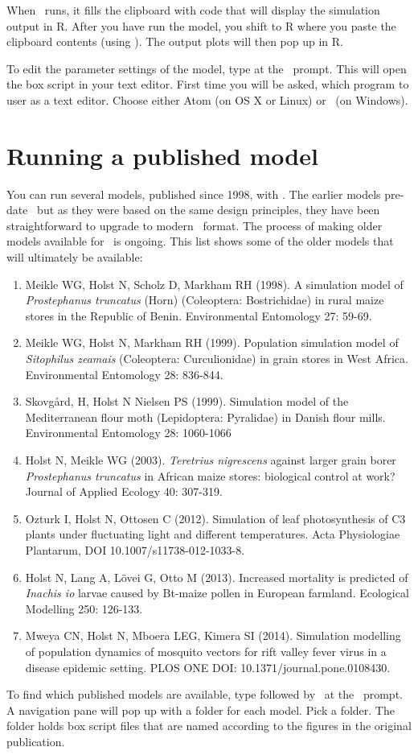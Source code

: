 When \US\ runs, it fills the clipboard with code that will display the simulation output in R. After you have run the model, you shift to R where you paste the clipboard contents (using \pastekey). The output plots will then pop up in R.

To edit the parameter settings of the model, type  at the \US\ prompt. This will open the box script in your text editor. First time you will be asked, which program to user as a text editor. Choose either Atom (on OS X or Linux) or \NPP\ (on Windows). 

\section{Running a published model}
You can run several models, published since 1998, with \US. The earlier models pre-date \US\ but as they were based on the same design principles, they have been straightforward to upgrade to modern \US\ format. The process of making older models available for \US\ is ongoing. This list shows some of the older models that will ultimately be available:

\begin{enumerate}
\item Meikle WG, Holst N, Scholz D, Markham RH (1998). A simulation model of \emph{Prostephanus truncatus} (Horn) (Coleoptera: Bostrichidae) in rural maize stores in the Republic of Benin. Environmental Entomology 27: 59-69.
\item Meikle WG, Holst N, Markham RH (1999). Population simulation model of \emph{Sitophilus zeamais} (Coleoptera: Curculionidae) in grain stores in West Africa. Environmental Entomology 28: 836-844.
\item Skovg\aa{}rd, H, Holst N Nielsen PS (1999). Simulation model of the Mediterranean flour moth (Lepidoptera: Pyralidae) in Danish flour mills. Environmental Entomology 28: 1060-1066
\item Holst N, Meikle WG (2003). \emph{Teretrius nigrescens} against larger grain borer \emph{Prostephanus truncatus} in African maize stores: biological control at work? Journal of Applied Ecology 40: 307-319. 
\item Ozturk I, Holst N, Ottosen C (2012). Simulation of leaf photosynthesis of C3 plants under fluctuating light and different temperatures. Acta Physiologiae Plantarum, DOI 10.1007/s11738-012-1033-8.
\item Holst N, Lang A, L\"{o}vei G, Otto M (2013). Increased mortality is predicted of \emph{Inachis io} larvae caused by Bt-maize pollen in European farmland. Ecological Modelling 250: 126-133.
\item Mweya CN, Holst N,  Mboera LEG, Kimera SI (2014). Simulation modelling of population dynamics of mosquito vectors for rift valley fever virus in a disease epidemic setting. PLOS ONE DOI: 10.1371/journal.pone.0108430.
\end{enumerate}

To find which published models are available, type  followed by \autofillkey\ at the \US\ prompt. A navigation pane will pop up with a folder for each model. Pick a folder. The folder holds box script files that are named according to the figures in the original publication.